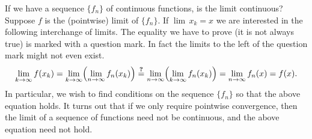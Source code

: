 \documentclass[12pt]{book}
\theoremstyle{plain}
\theoremstyle{remark}
\theoremstyle{definition}
\theoremstyle{exercise}
\theoremstyle{example}
\begin{document}
If we have a sequence $\{ f_n \}$ of continuous functions, is the limit continuous?
Suppose $f$ is the (pointwise) limit of $\{ f_n \}$.
If $\lim\, x_k = x$
we are interested in the following
interchange of limits.  The equality we have to prove (it is not always true)
is marked with a question mark.  In fact the limits to the left
of the question mark might not even exist.
\begin{equation*}
\lim_{k \to \infty} 
f(x_k)
=
\lim_{k \to \infty} 
\Bigl(
\lim_{n \to \infty} f_n(x_k)
\Bigr)
\overset{\text{\textbf{?}}}{=}
\lim_{n \to \infty}
\Bigl(
\lim_{k \to \infty} 
f_n(x_k)
\Bigr)
=
\lim_{n \to \infty}
f_n(x)
=
f(x) .
\end{equation*}
In particular, we wish to find conditions on the sequence $\{ f_n \}$
so that the above equation holds.
It turns out that if we only require pointwise convergence, then the limit
of a sequence of functions need not be continuous, and the above equation
need not hold.
\end{document}
